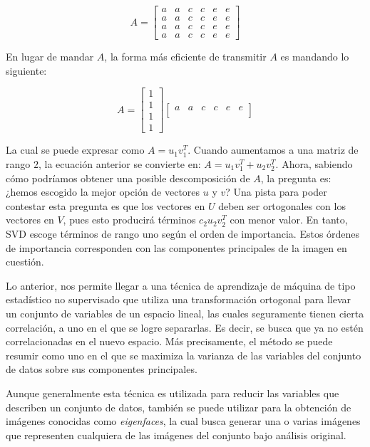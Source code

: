 \documentclass[conference]{IEEEtran}
\begin{document}
\begin{equation*}
    A = \begin{bmatrix}
        a & a & c & c & e & e \\
        a & a & c & c & e & e \\
        a & a & c & c & e & e \\
        a & a & c & c & e & e
    \end{bmatrix}
\end{equation*}

En lugar de mandar $A$, la forma más eficiente de transmitir $A$ es mandando lo siguiente: 

\begin{equation*}
    A = 
\begin{bmatrix}
    1 \\ 1 \\ 1 \\ 1
\end{bmatrix}
\begin{bmatrix}
    a & a & c & c & e & e \\
\end{bmatrix}
\end{equation*}

La cual se puede expresar como $A = u_1v_1^T$. Cuando aumentamos a una matriz de rango $2$, la ecuación anterior se convierte en: $A = u_1v_1^T + u_2v_2^T$. Ahora, sabiendo cómo podríamos obtener una posible descomposición de $A$, la pregunta es: ¿hemos escogido la mejor opción de vectores $u$ y $v$? Una pista para poder contestar esta pregunta es que los vectores en $U$ deben ser ortogonales con los vectores en $V$, pues esto producirá términos $c_2u_2v_2^T$ con menor valor. En tanto, SVD escoge términos de rango uno según el orden de importancia. Estos órdenes de importancia corresponden con las componentes principales de la imagen en cuestión.

Lo anterior, nos permite llegar a una técnica de aprendizaje de máquina de tipo estadístico no supervisado que utiliza una transformación ortogonal para llevar un conjunto de variables de un espacio lineal, las cuales seguramente tienen cierta correlación, a uno en el que se logre separarlas. Es decir, se busca que ya no estén correlacionadas en el nuevo espacio. Más precisamente, el método se puede resumir como uno en el que se maximiza la varianza de las variables del conjunto de datos sobre sus componentes principales.

Aunque generalmente esta técnica es utilizada para reducir las variables que describen un conjunto de datos, también se puede utilizar para la obtención de imágenes conocidas como \textit{eigenfaces}, la cual busca generar una o varias imágenes que representen cualquiera de las imágenes del conjunto bajo análisis original.
\end{document}
